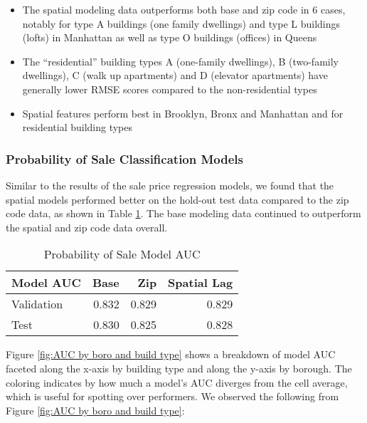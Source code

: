 \documentclass[12pt,]{article}
\providecommand{\tightlist}{%
  \setlength{\itemsep}{0pt}\setlength{\parskip}{0pt}}
\begin{document}
\begin{itemize}
\tightlist
\item
  The spatial modeling data outperforms both base and zip code in 6
  cases, notably for type A buildings (one family dwellings) and type L
  buildings (lofts) in Manhattan as well as type O buildings (offices)
  in Queens
\item
  The ``residential'' building types A (one-family dwellings), B
  (two-family dwellings), C (walk up apartments) and D (elevator
  apartments) have generally lower RMSE scores compared to the
  non-residential types
\item
  Spatial features perform best in Brooklyn, Bronx and Manhattan and for
  residential building types
\end{itemize}

\hypertarget{probability-of-sale-classification-models}{%
\subsubsection{Probability of Sale Classification
Models}\label{probability-of-sale-classification-models}}

Similar to the results of the sale price regression models, we found
that the spatial models performed better on the hold-out test data
compared to the zip code data, as shown in Table
\ref{tab:ProbSaleModelAUC}. The base modeling data continued to
outperform the spatial and zip code data overall.

\begin{table}

\caption{\label{tab:Prob Model AUC}\label{tab:ProbSaleModelAUC} Probability of Sale Model AUC}
\centering
\begin{tabular}[t]{lrrr}
\toprule
Model AUC & Base & Zip & Spatial Lag\\
\midrule
Validation & 0.832 & 0.829 & 0.829\\
Test & 0.830 & 0.825 & 0.828\\
\bottomrule
\end{tabular}
\end{table}

Figure \ref{fig:AUC by boro and build type} shows a breakdown of model
AUC faceted along the x-axis by building type and along the y-axis by
borough. The coloring indicates by how much a model's AUC diverges from
the cell average, which is useful for spotting over performers. We
observed the following from Figure \ref{fig:AUC by boro and build type}:
\end{document}
